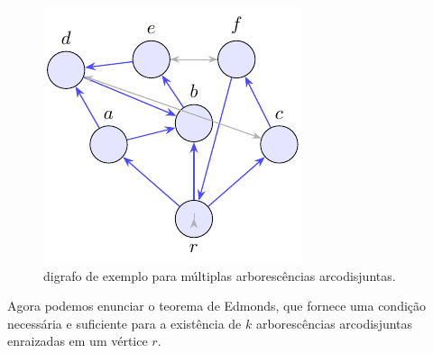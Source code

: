 \begin{figure}[H]
	\centering
	\includegraphics[width=0.9\linewidth]{figures/fig_exemplo_multiplas_arborescencias.pdf}

	\caption{digrafo de exemplo para múltiplas arborescências arcodisjuntas.}
	\label{fig:exemplo-multiplas-arborescencias}\end{figure}



Agora podemos enunciar o teorema de Edmonds, que fornece uma condição necessária e suficiente para a existência de \(k\) arborescências arcodisjuntas enraizadas em um vértice \(r\).


